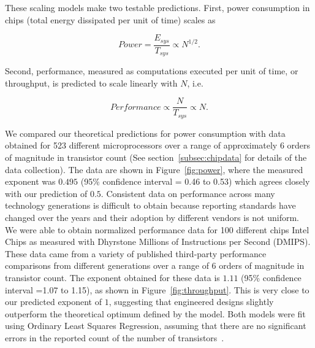 \documentclass[12pt]{article}
\begin{document}
These scaling models make two testable predictions.  First, power
consumption in chips (total energy dissipated per unit of time) scales as

\begin{equation}
\label{eq:Power}
Power = \frac{E_{sys}}{T_{sys}} \propto N^{1/2} .
\end{equation}
 
\noindent Second, performance,
measured as computations executed per unit of time, or throughput, is predicted
to scale linearly with $N$,  i.e.  

\begin{equation}
\label{eq:Performance}
Performance\propto \frac{N}{T_{sys}} \propto N .
\end{equation}

We compared our theoretical predictions for power consumption with data
obtained for 523 different microprocessors over a range of approximately 6
orders of magnitude in transistor count (See section~\ref{subsec:chipdata} for
details of the data collection).  The data are shown in
Figure~\ref{fig:power}, where the measured exponent was $0.495$ (95\%
confidence interval = 0.46 to 0.53) which agrees closely with our prediction of
$0.5$. Consistent data on performance across many technology generations is
difficult to obtain because reporting standards have changed over the years and
their adoption by different vendors is not uniform.  We were able to obtain
normalized performance data for 100 different chips Intel Chips as measured
with Dhyrstone Millions of Instructions per Second (DMIPS). These data came from
a variety of published third-party performance comparisons from different
generations over a range of 6 orders of magnitude in transistor count.  The
exponent obtained for these data is $1.11$ (95\% confidence interval =1.07 to
1.15), as shown in Figure~\ref{fig:throughput}. This is very close to our
predicted exponent of $1$, suggesting that engineered designs slightly
outperform the theoretical optimum defined by the model. Both models were fit
using Ordinary Least Squares Regression, assuming that there
are no significant errors in the reported count of the number of transistors~\cite{mcardle1988structural}.  
\end{document}
